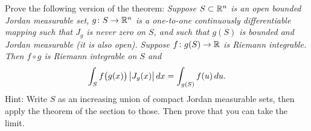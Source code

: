 \begin{exercise}
\pagebreak[2]
Prove the following version of the theorem:
\emph{Suppose $S \subset {\mathbb{R}}^n$ is an open bounded Jordan measurable set,
$g \colon S \to {\mathbb{R}}^n$ is a one-to-one
continuously differentiable mapping such that
$J_g$ is never zero on $S$, and such that $g(S)$ is bounded and
Jordan measurable (it is also open).
Suppose $f \colon g(S) \to {\mathbb{R}}$ is Riemann
integrable.  Then $f \circ g$ is Riemann integrable on $S$ and}
\begin{equation*}
\int_S f\bigl(g(x)\bigr) \, \bigl\lvert {J_g(x)} \bigr\rvert \, dx
=
\int_{g(S)} f(u) \, du .
\end{equation*}
Hint: Write $S$ as an increasing union of compact Jordan measurable
sets, then apply the theorem of the section to those.  Then prove that you
can take the limit.
\end{exercise}

